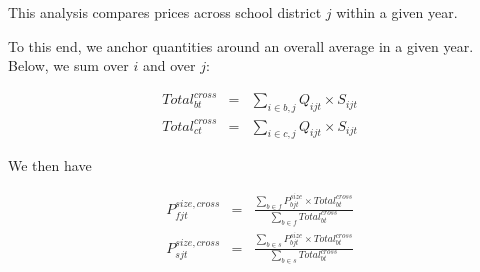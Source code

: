 \documentclass[11pt]{article}
\begin{document}
This analysis compares prices across school district $j$ within a given year.

To this end, we anchor quantities around an overall average in a given year. Below, we sum over $i$ and over $j$:

\begin{eqnarray} 
	Total^{cross}_{bt}&=&\sum_{i\in b, j}  Q_{ijt}\times S_{ijt} \\
	Total^{cross}_{ct}&=&\sum_{i\in c , j}  Q_{ijt}\times S_{ijt} 
\end{eqnarray}	

We then have 

\begin{eqnarray} 
	P^{size,cross}_{fjt}&=&\frac{\sum_{b\in f} P^{size}_{bjt}\times Total^{cross}_{bt}} {\sum_{b\in f} Total^{cross}_{bt}} \\
	P^{size,cross}_{sjt}&=&\frac{\sum_{b\in s} P^{size}_{bjt}\times Total^{cross}_{bt}} {\sum_{b\in s} Total^{cross}_{bt}} 
\end{eqnarray}	
\end{document}
